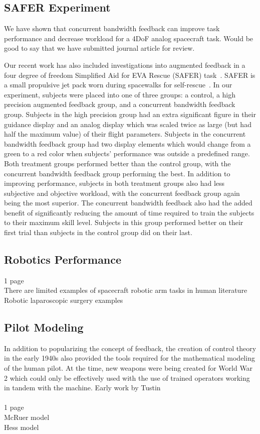 \documentclass{paper}
\begin{document}
\subsection{SAFER Experiment}
We have shown that concurrent bandwidth feedback can improve task performance and decrease workload for a 4DoF analog spacecraft task.
Would be good to say that we have submitted journal article for review.

Our recent work has also included investigations into augmented feedback in a four degree of freedom Simplified Aid for EVA Rescue (SAFER) task~\cite{Karasinski2017}.
SAFER is a small propulsive jet pack worn during spacewalks for self-rescue~\cite{Vassigh1998}.
In our experiment, subjects were placed into one of three groups: a control, a high precision augmented feedback group, and a concurrent bandwidth feedback group.
Subjects in the high precision group had an extra significant figure in their guidance display and an analog display which was scaled twice as large (but had half the maximum value) of their flight parameters.
Subjects in the concurrent bandwidth feedback group had two display elements which would change from a green to a red color when subjects' performance was outside a predefined range.
Both treatment groups performed better than the control group, with the concurrent bandwidth feedback group performing the best.
In addition to improving performance, subjects in both treatment groups also had less subjective and objective workload, with the concurrent feedback group again being the most superior.
The concurrent bandwidth feedback also had the added benefit of significantly reducing the amount of time required to train the subjects to their maximum skill level.
Subjects in this group performed better on their first trial than subjects in the control group did on their last.


\subsection{Robotics Performance}
1 page\\
There are limited examples of spacecraft robotic arm tasks in human literature\\
Robotic laparoscopic surgery examples

\subsection{Pilot Modeling}
In addition to popularizing the concept of feedback, the creation of control theory in the early 1940s also provided the tools required for the mathematical modeling of the human pilot. At the time, new weapons were being created for World War 2 which could only be effectively used with the use of trained operators working in tandem with the machine. Early work by Tustin~\cite{tustininvestigation}\\
\\
1 page\\
McRuer model\\
Hess model\\
\end{document}
